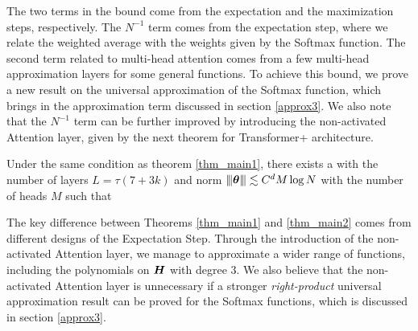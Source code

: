 \begin{remark}
The two terms in the bound come from the expectation and the maximization steps, respectively. The $N^{-1}$ term comes from the expectation step, where we relate the weighted average with the weights given by the Softmax function. The second term related to multi-head attention comes from a few multi-head approximation layers for some general functions. To achieve this bound, we prove a new result on the universal approximation of the Softmax function, which brings in the approximation term discussed in section \ref{approx3}. We also note that the $N^{-1}$ term can be further improved by introducing the non-activated Attention layer, given by the next theorem for Transformer+ architecture. 
\end{remark} 
\begin{theorem}\label{thm_main2}
    Under the same condition as theorem \ref{thm_main1}, there exists a \tfp with the number of layers $L=\tau(7+3k)$ and norm ${\left\vert\kern-0.25ex\left\vert\kern-0.25ex\left\vert \boldsymbol{\theta} \right\vert\kern-0.25ex\right\vert\kern-0.25ex\right\vert}\lesssim C^dM\log N$ with the number of heads $M$ such that
\end{theorem}
\begin{remark}
    The key difference between Theorems \ref{thm_main1} and \ref{thm_main2} comes from different designs of the Expectation Step. Through the introduction of the non-activated Attention layer, we manage to approximate a wider range of functions, including the polynomials on $\boldsymbol{H}$ with degree $3$. We also believe that the non-activated Attention layer is unnecessary if a stronger \emph{right-product} universal approximation result can be proved for the Softmax functions, which is discussed in section \ref{approx3}.
\end{remark}
